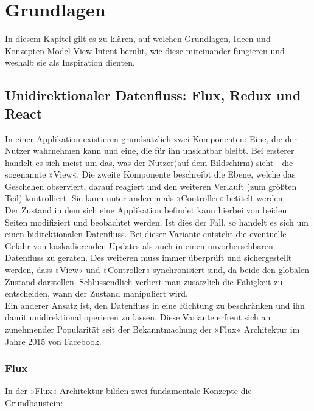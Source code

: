 \section{Grundlagen}
\label{sec:grundlagen}

In diesem Kapitel gilt es zu klären, auf welchen Grundlagen, Ideen und Konzepten Model-View-Intent beruht, wie diese miteinander fungieren und weshalb sie als Inspiration dienten.

\subsection{Unidirektionaler Datenfluss: Flux, Redux und React}

In einer Applikation existieren grundsätzlich zwei Komponenten: Eine, die der Nutzer wahrnehmen kann und eine, die für ihn unsichtbar bleibt. Bei ersterer handelt es sich meist um das, was der Nutzer(auf dem Bildschirm) sieht - die sogenannte »View«. Die zweite Komponente beschreibt die Ebene, welche das Geschehen observiert, darauf reagiert und den weiteren Verlauft (zum größten Teil) kontrolliert. Sie kann unter anderem als »Controller« betitelt werden.
\\
Der Zustand in dem sich eine Applikation befindet kann hierbei von beiden Seiten modifiziert und beobachtet werden. Ist dies der Fall, so handelt es sich um einen bidirektionalen Datenfluss. Bei dieser Variante entsteht die eventuelle Gefahr von kaskadierenden Updates als auch in einen unvorhersehbaren Datenfluss zu geraten. Des weiteren muss immer überprüft und sichergestellt werden, dass »View« und »Controller« synchronisiert sind, da beide den globalen Zustand darstellen. Schlussendlich verliert man zusätzlich die Fähigkeit zu entscheiden, wann der Zustand manipuliert wird.
\\
Ein anderer Ansatz ist, den Datenfluss in eine Richtung zu beschränken und ihn damit unidirektional
\cite{unidirectionalDataFlowFluxArchitectureIlyGelman2017, unidirectionalDataFlowTheCompleteReduxBookIlyGelman2017}
operieren zu lassen. Diese Variante erfreut sich an zunehmender Popularität seit der Bekanntmachung der »Flux«
\cite{fluxArchitectureAdamBoduch}
Architektur im Jahre 2015 von Facebook.
\cite{fluxAnnouncementYoutube}

\subsubsection{Flux}
In der »Flux« Architektur bilden zwei fundamentale Konzepte die Grundbaustein: 